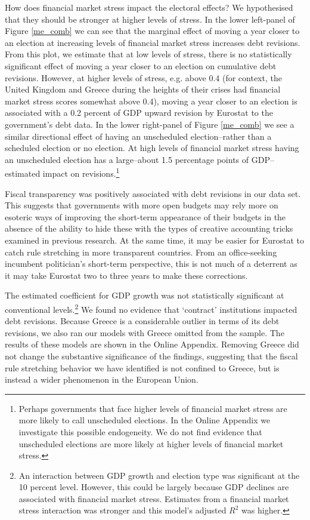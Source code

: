\documentclass[]{article}
\begin{document}
How does financial market stress impact the electoral effects? We hypothesised that they should be stronger at higher levels of stress. In the lower left-panel of Figure \ref{me_comb} we can see that the marginal effect of moving a year closer to an election at increasing levels of financial market stress increases debt revisions. From this plot, we estimate that at low levels of stress, there is no statistically significant effect of moving a year closer to an election on cumulative debt revisions. However, at higher levels of stress, e.g. above 0.4 (for context, the United Kingdom and Greece during the heights of their crises had financial market stress scores somewhat above 0.4), moving a year closer to an election is associated with a 0.2 percent of GDP upward revision by Eurostat to the government's debt data. In the lower right-panel of Figure \ref{me_comb} we see a similar directional effect of having an unscheduled election--rather than a scheduled election or no election. At high levels of financial market stress having an unscheduled election has a large--about 1.5 percentage points of GDP--estimated impact on revisions.\footnote{Perhaps governments that face higher levels of financial market stress are more likely to call unscheduled elections. In the Online Appendix we investigate this possible endogeneity. We do not find evidence that unscheduled elections are more likely at higher levels of financial market stress.}

Fiscal transparency was positively associated with debt revisions in our data set. This suggests that governments with more open budgets may rely more on esoteric ways of improving the short-term appearance of their budgets in the absence of the ability to hide these with the types of creative accounting tricks examined in previous research. At the same time, it may be easier for Eurostat to catch rule stretching in more transparent countries. From an office-seeking incumbent politician's short-term perspective, this is not much of a deterrent as it may take Eurostat two to three years to make these corrections.

The estimated coefficient for GDP growth was not statistically significant at conventional levels.\footnote{An interaction between GDP growth and election type was significant at the 10 percent level. However, this could be largely because GDP declines are associated with financial market stress. Estimates from a financial market stress interaction was stronger and this model's adjusted $R^{2}$ was higher.} We found no evidence that `contract' institutions impacted debt revisions. Because Greece is a considerable outlier in terms of its debt revisions, we also ran our models with Greece omitted from the sample. The results of these models are shown in the Online Appendix. Removing Greece did not change the substantive significance of the findings, suggesting that the fiscal rule stretching behavior we have identified is not confined to Greece, but is instead a wider phenomenon in the European Union.
\end{document}
